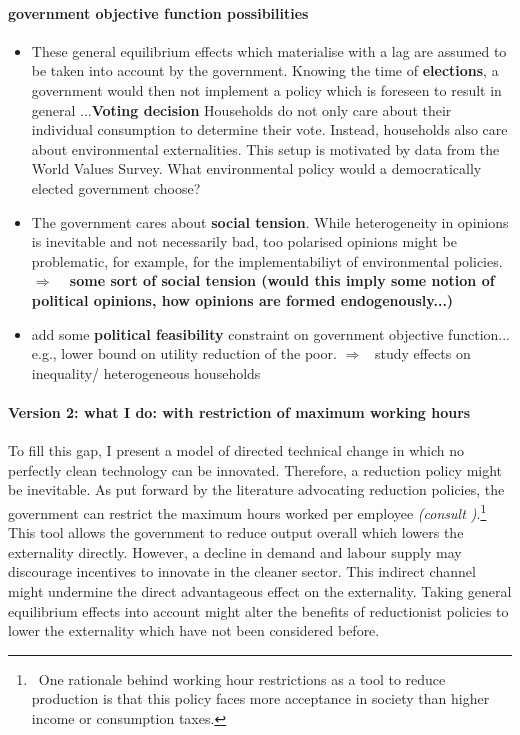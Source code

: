\documentclass[12pt]{article}
\newcommand{\ar}{$\Rightarrow$ \ }
\begin{document}
\paragraph{government objective function possibilities}
\begin{itemize}
\item  These general equilibrium effects which materialise with a lag are assumed to be taken into account by the government. Knowing the time of \textbf{elections}, a government would then not implement a policy which is foreseen to result in general ...\textbf{Voting decision}
Households do not only care about their individual consumption to determine their vote. Instead, households also care about environmental externalities. This setup is motivated by data from the World Values Survey.
What environmental policy would a democratically elected government choose? 
 
\item The government cares about \textbf{social tension}. While heterogeneity in opinions is inevitable and not necessarily bad, too polarised opinions might be problematic, for example, for the implementabiliyt of environmental policies.  \ar \textbf{ some sort of social tension (would this imply some notion of political opinions, how opinions are formed endogenously...)}
\item add some \textbf{political feasibility} constraint on government objective function... e.g., lower bound on utility reduction of the poor. \ar study effects on inequality/ heterogeneous households 
\end{itemize}




\paragraph{Version 2: what I do: with restriction of maximum working hours}
To fill this gap, I present a model of directed technical change in which no perfectly clean technology can be innovated. Therefore, a reduction policy might be inevitable. As put forward by the literature advocating reduction policies, the government can restrict the maximum hours worked per employee \textit{(consult \cite{Schor2005SustainableReduction})}.\footnote{\ One rationale behind working hour restrictions as a tool to reduce production is that this policy faces more acceptance in society than higher income or consumption taxes.}
This tool allows the government to reduce output overall which lowers the externality directly.
However, a decline in demand and labour supply may discourage incentives to innovate in the cleaner sector. This indirect channel might undermine the direct advantageous effect on the externality. Taking general equilibrium effects into account might alter the benefits of reductionist policies to lower the externality which have not been considered before. 
\end{document}
